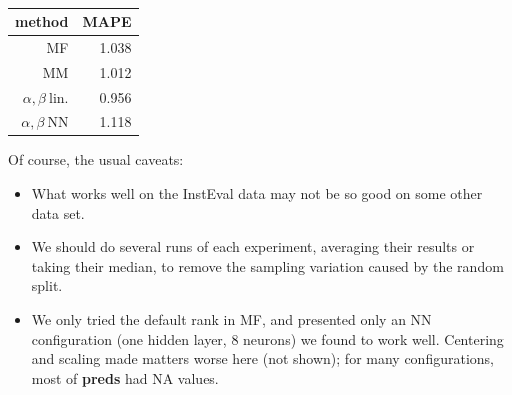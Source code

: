 \begin{table}
\begin{center}
\vskip 0.5in
\begin{tabular}{|r|r|}
\hline
method & MAPE \\ \hline 
\hline
MF & 1.038 \\ \hline 
MM & 1.012 \\ \hline 
$\alpha, \beta ~ \textrm{lin.}$ & 0.956 \\ \hline 
$\alpha, \beta ~ \textrm{NN}$ & 1.118 \\ \hline 
\end{tabular}
\end{center}
\caption{}
\label{}
\end{table}

Of course, the usual caveats:

\begin{itemize}

\item What works well on the InstEval data may not be so good on some
other data set.

\item We should do several runs of each experiment, averaging their
results or taking their median, to remove the sampling variation caused
by the random split.

\item We only tried the default rank in MF, and presented only an
NN configuration (one hidden layer, 8 neurons) we found to work well.
Centering and scaling made matters worse here (not shown); 
for many configurations, most of \textbf{preds} had NA values.

\end{itemize} 
